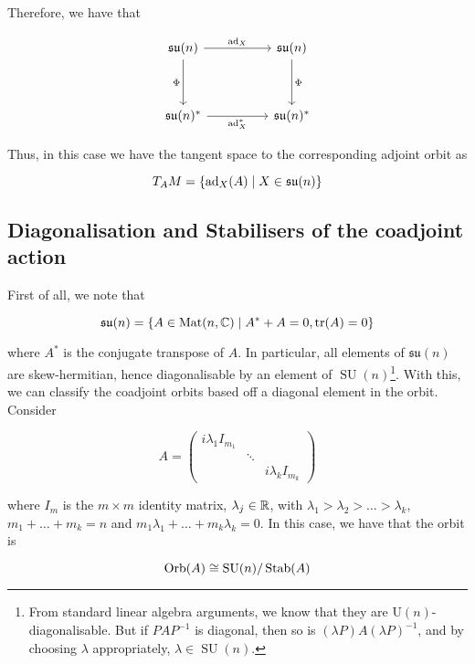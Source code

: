 \documentclass{article}
\DeclareMathOperator{\SU}{SU}
\newcommand{\su}{\mathfrak{su}}
\begin{document}
Therefore, we have that

\[\begin{tikzcd}
	{\su(n)} && {\su(n)} \\
	\\
	{\su(n)^*} && {\su(n)^*}
	\arrow["\Phi"', from=1-1, to=3-1]
	\arrow["\Phi", from=1-3, to=3-3]
	\arrow["{\ad_X}", from=1-1, to=1-3]
	\arrow["{\ad_X^*}"', from=3-1, to=3-3]
\end{tikzcd}\]

Thus, in this case we have the tangent space to the corresponding adjoint orbit as

\[T_A M = \left\{\ad_X(A) \mid X \in \su(n)\right\}\]

\subsection{Diagonalisation and Stabilisers of the coadjoint action}

First of all, we note that

\[\su(n) = \left\{A \in \Mat(n, \C) \mid A^* + A = 0, \tr(A) = 0\right\}\]

where \(A^*\) is the conjugate transpose of \(A\). In particular, all elements of \(\su(n)\) are skew-hermitian, hence diagonalisable by an element of \(\SU(n)\)\footnote{From standard linear algebra arguments, we know that they are \(\mathrm U(n)\)-diagonalisable. But if \(PAP^{-1}\) is diagonal, then so is \((\lambda P)A(\lambda P)^{-1}\), and by choosing \(\lambda\) appropriately, \(\lambda \in \SU(n)\).}. With this, we can classify the coadjoint orbits based off a diagonal element in the orbit. Consider

\[A = \begin{pmatrix}
    i\lambda_1 I_{m_1} \\
    & \ddots \\
    & & i\lambda_k I_{m_k}
\end{pmatrix}\]

where \(I_m\) is the \(m \times m\) identity matrix, \(\lambda_j \in \mathbb{R}\), with \(\lambda_1 > \lambda_2 > \dots > \lambda_k\), \(m_1 + \dots + m_k = n\) and \(m_1\lambda_1 + \dots + m_k\lambda_k = 0\). In this case, we have that the orbit is

\[\Orb(A) \cong \SU(n)/\Stab(A)\]
\end{document}
